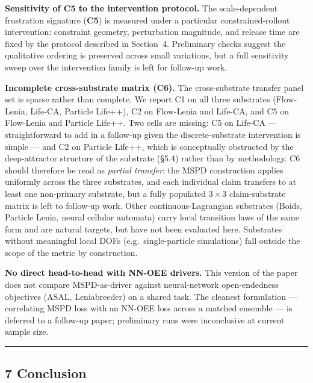 \documentclass[
  11pt,
]{article}
\begin{document}
\textbf{Sensitivity of C5 to the intervention protocol.}
The scale-dependent frustration signature (\textbf{C5}) is
measured under a particular constrained-rollout intervention:
constraint geometry, perturbation magnitude, and release time
are fixed by the protocol described in Section~4. Preliminary
checks suggest the qualitative ordering is preserved across
small variations, but a full sensitivity sweep over the
intervention family is left for follow-up work.

\textbf{Incomplete cross-substrate matrix (C6).} The
cross-substrate transfer panel set is sparse rather than
complete. We report C1 on all three substrates (Flow-Lenia,
Life-CA, Particle Life++), C2 on Flow-Lenia and Life-CA, and
C5 on Flow-Lenia and Particle Life++. Two cells are missing:
C5 on Life-CA --- straightforward to add in a follow-up given
the discrete-substrate intervention is simple --- and C2 on
Particle Life++, which is conceptually obstructed by the
deep-attractor structure of the substrate (\S5.4) rather than
by methodology. C6 should therefore be read as \emph{partial
transfer}: the MSPD construction applies uniformly across the
three substrates, and each individual claim transfers to at
least one non-primary substrate, but a fully populated
$3\times3$ claim-substrate matrix is left to follow-up work.
Other continuous-Lagrangian substrates (Boids, Particle Lenia,
neural cellular automata) carry local transition laws of the
same form and are natural targets, but have not been evaluated
here. Substrates without meaningful local DOFs (e.g.\
single-particle simulations) fall outside the scope of the
metric by construction.

\textbf{No direct head-to-head with NN-OEE drivers.}
This version of the paper does not compare MSPD-as-driver
against neural-network open-endedness objectives (ASAL,
Leniabreeder) on a shared task. The cleanest formulation ---
correlating MSPD loss with an NN-OEE loss across a matched
ensemble --- is deferred to a follow-up paper; preliminary
runs were inconclusive at current sample size.

\begin{center}\rule{0.5\linewidth}{0.5pt}\end{center}

\subsection{7 Conclusion}\label{conclusion}
\end{document}
